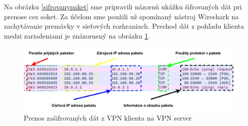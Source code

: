 Na obrázku \ref{sifrovanypaket} sme pripravili názornú ukážku šifrovaných dát pri prenose cez soket. Za účelom sme použili už spomínaný nástroj Wireshark na zachytávanie premávky v sieťových rozhraniach. Prechod dát z pohľadu klienta medzi zariadeniami je znázornený na obrázku \ref{wiresharkpakety}. 
\begin{figure}[h!]
	\centering
	\includegraphics[width=1\textwidth]{figures/wiresharkpakety}
	\caption{Prenos zašifrovaných dát z VPN klienta na VPN server}
	\label{wiresharkpakety}
\end{figure}

